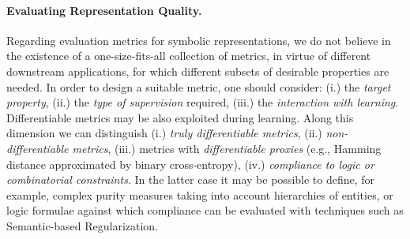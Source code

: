 \paragraph{Evaluating Representation Quality.} Regarding evaluation metrics for symbolic representations, we do not believe in the existence of a one-size-fits-all collection of metrics, in virtue of different downstream applications, for which different subsets of desirable properties are needed. %
In order to design a suitable metric, one should consider: (i.) the \textit{target property}, (ii.) the \textit{type of supervision} required, (iii.) the \textit{interaction with learning}. %
%
%
%
%
Differentiable metrics may be also exploited during learning. Along this dimension we can distinguish (i.) \textit{truly differentiable metrics}, (ii.) \textit{non-differentiable metrics}, (iii.) metrics with \textit{differentiable proxies} (e.g., Hamming distance approximated by binary cross-entropy), (iv.) \textit{compliance to logic or combinatorial constraints}.
In the latter case it may be possible to define, for example, complex purity measures taking into account hierarchies of entities, or logic formulae against which compliance can be evaluated with techniques such as Semantic-based Regularization.

